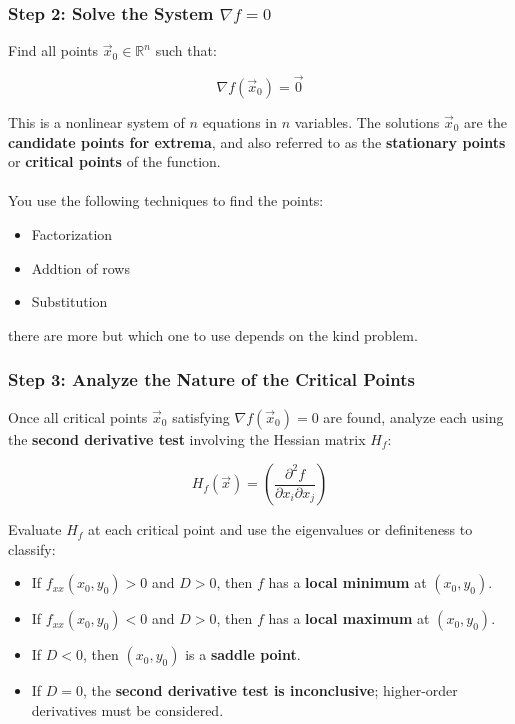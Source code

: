 \subsubsection{Step 2: Solve the System \( \nabla f = 0 \)}

Find all points \( \vec{x}_0 \in \mathbb{R}^n \) such that:

\[
\nabla f(\vec{x}_0) = \vec{0}
\]

This is a nonlinear system of \( n \) equations in \( n \) variables. The solutions \( \vec{x}_0 \) are the \textbf{candidate points for extrema}, and also referred to as the \textbf{stationary points} or \textbf{critical points} of the function.
\\\\
You use the following techniques to find the points: 
\begin{itemize}[label=\(-\)]
    \item Factorization
    \item Addtion of rows
    \item Substitution
\end{itemize}

there are more but which one to use depends on the kind problem.

\subsubsection{Step 3: Analyze the Nature of the Critical Points}

Once all critical points \( \vec{x}_0 \) satisfying \( \nabla f(\vec{x}_0) = 0 \) are found, analyze each using the \textbf{second derivative test} involving the Hessian matrix \( H_f \):

\[
H_f(\vec{x}) = \left( \frac{\partial^2 f}{\partial x_i \partial x_j} \right)
\]

Evaluate \( H_f \) at each critical point and use the eigenvalues or definiteness to classify:

\begin{itemize}[label=\(-\)]
    \item If \( f_{xx}(x_0, y_0) > 0 \) and \( D > 0 \), then \( f \) has a \textbf{local minimum} at \( (x_0, y_0) \).
    \item If \( f_{xx}(x_0, y_0) < 0 \) and \( D > 0 \), then \( f \) has a \textbf{local maximum} at \( (x_0, y_0) \).
    \item If \( D < 0 \), then \( (x_0, y_0) \) is a \textbf{saddle point}.
    \item If \( D = 0 \), the \textbf{second derivative test is inconclusive}; higher-order derivatives must be considered.
\end{itemize}

